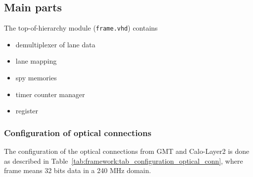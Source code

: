\clearpage

\subsection{Main parts}

The top-of-hierarchy module (\texttt{frame.vhd}) contains
\begin {itemize}
\item demultiplexer of lane data
\item lane mapping
\item spy memories
\item timer counter manager
\item register
\end {itemize}

\subsubsection{Configuration of optical connections} \label{sec:framework:sec_configuration_optical_conn}
The configuration of the optical connections from GMT and Calo-Layer2 is done as described in Table~\ref{tab:framework:tab_configuration_optical_conn}, where frame means 32 bits data in a 240 MHz domain.

